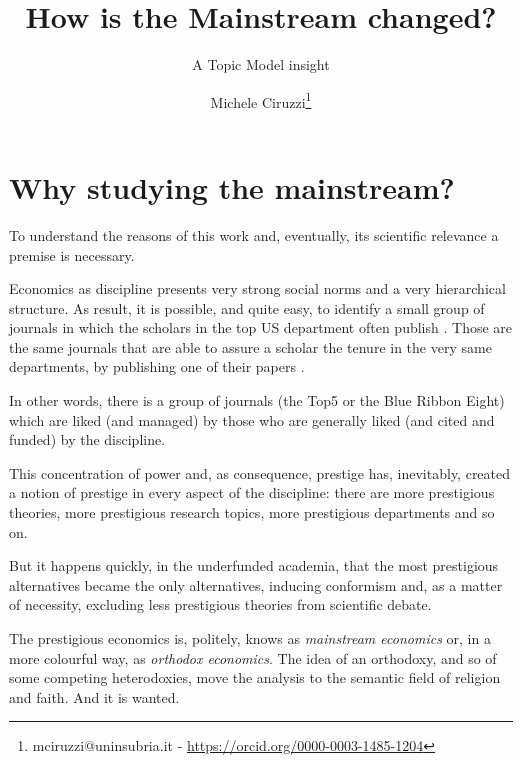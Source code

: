 \documentclass[a4paper, 11pt, headings=standardclasses, tablecaptionsbelow]{scrartcl}
\title{How is the Mainstream changed? \let\thefootnote\relax\footnotetext{
  This version is intended to be submitted to the XV ESHET Conference
  
  An updated version of this paper and all the source code and the instructions required to replicate the paper are available at \url{https://github.com/TnTo/mainstream/}
}}
\subtitle{A Topic Model insight}
\author{Michele Ciruzzi\thanks{mciruzzi@uninsubria.it - \url{https://orcid.org/0000-0003-1485-1204}}}
\begin{document}
\maketitle


\section{Why studying the mainstream?}
To understand the reasons of this work and, eventually, its scientific relevance a premise is necessary.

Economics as discipline presents very strong social norms and a very hierarchical structure.
As result, it is possible, and quite easy, to identify a small group of journals in which the scholars in the top US department often publish \parencite{card2013,kim2006,kim2009,dusansky1998,hamermesh2013,ellison2003,heck2006}.
Those are the same journals that are able to assure a scholar the tenure in the very same departments, by publishing one of their papers \parencite{heckman2020}.

In other words, there is a group of journals (the Top5 or the Blue Ribbon Eight) which are liked (and managed) by those who are generally liked (and cited and funded) by the discipline.

This concentration of power and, as consequence, prestige has, inevitably, created a notion of prestige in every aspect of the discipline: there are more prestigious theories, more prestigious research topics, more prestigious departments and so on.

But it happens quickly, in the underfunded academia, that the most prestigious alternatives became the only alternatives, inducing conformism and, as a matter of necessity, excluding less prestigious theories from scientific debate.

The prestigious economics is, politely, knows as \textit{mainstream economics} or, in a more colourful way, as \textit{orthodox economics}. The idea of an orthodoxy, and so of some competing heterodoxies, move the analysis to the semantic field of religion and faith. And it is wanted.
\end{document}
